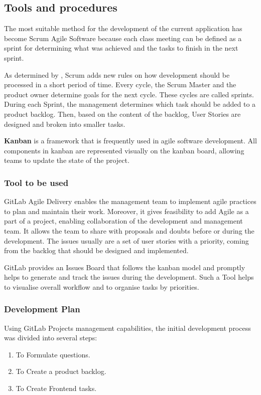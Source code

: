 \documentclass[a4paper]{article}
\begin{document}
    \newpage

    \subsection{Tools and procedures}
    
   The most suitable method for the development of the current application has become Scrum Agile Software because each class meeting can be defined as a sprint for determining what was achieved and the tasks to finish in the next sprint.
   
   As determined by \cite{lehtovirta2017managing}, Scrum adds new rules on how development should be processed in a short period of time. Every cycle, the Scrum Master and the product owner determine goals for the next cycle. These cycles are called sprints. During each Sprint, the management determines which task should be added to a product backlog.  Then, based on the content of the backlog, User Stories are designed and broken into smaller tasks. 
   
   \textbf{Kanban} is a framework that is frequently used in agile software development. All components in kanban are represented visually on the kanban board, allowing teams to update the state of the project.
   
    \subsubsection{ Tool to be used}
    GitLab Agile Delivery enables the management team to implement agile practices to plan and maintain their work. Moreover, it gives feasibility to add Agile as a part of a project, enabling collaboration of the development and management team. It allows the team to share with proposals and doubts before or during the development. The issues usually are a set of user stories with a priority, coming from the backlog that should be designed and implemented. 
    
    GitLab provides an Issues Board that follows the kanban model and promptly helps to generate and track the issues during the development. Such a Tool helps to visualise overall workflow and to organise tasks by priorities. 
    
    \subsubsection{Development Plan}
    Using GitLab Projects management capabilities, the initial development process was divided into several steps:
    \begin{enumerate}
        \item To Formulate questions.
        \item To Create a product backlog.
        \item To Create Frontend tasks.
    \end{enumerate}  
   
\end{document}
